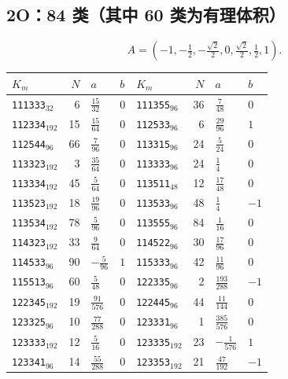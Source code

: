 \subsection{2O：84 类（其中 60 类为有理体积）}
\[ A=(-1,-\tfrac12,-\tfrac{\sqrt2}{2},0,\tfrac{\sqrt2}{2},\tfrac12,1).\]
{\footnotesize\begin{longtable}{@{}lrll@{\hspace{2em}}lrll@{}}
\toprule
$K_m$ & $N$ & $a$ & $b$ & $K_m$ & $N$ & $a$ & $b$\\\midrule\endhead
\texttt{111333}$_{32}$ & 6 & $\tfrac{15}{32}$ & 0 & \texttt{111355}$_{96}$ & 36 & $\tfrac{7}{48}$ & 0\\
\texttt{112334}$_{192}$ & 15 & $\tfrac{15}{64}$ & 0 & \texttt{112533}$_{96}$ & 6 & $\tfrac{29}{96}$ & $1$\\
\texttt{112544}$_{96}$ & 66 & $\tfrac{7}{96}$ & 0 & \texttt{113315}$_{96}$ & 24 & $\tfrac{5}{24}$ & 0\\
\texttt{113323}$_{192}$ & 3 & $\tfrac{35}{64}$ & 0 & \texttt{113333}$_{96}$ & 24 & $\tfrac{1}{4}$ & 0\\
\texttt{113334}$_{192}$ & 45 & $\tfrac{5}{64}$ & 0 & \texttt{113511}$_{48}$ & 12 & $\tfrac{17}{48}$ & 0\\
\texttt{113523}$_{192}$ & 18 & $\tfrac{19}{96}$ & 0 & \texttt{113533}$_{96}$ & 48 & $\tfrac{1}{4}$ & $-1$\\
\texttt{113534}$_{192}$ & 78 & $\tfrac{5}{96}$ & 0 & \texttt{113555}$_{96}$ & 84 & $\tfrac{1}{16}$ & 0\\
\texttt{114323}$_{192}$ & 33 & $\tfrac{9}{64}$ & 0 & \texttt{114522}$_{96}$ & 30 & $\tfrac{17}{96}$ & 0\\
\texttt{114533}$_{96}$ & 90 & $-\tfrac{5}{96}$ & $1$ & \texttt{115333}$_{96}$ & 42 & $\tfrac{11}{96}$ & 0\\
\texttt{115513}$_{96}$ & 60 & $\tfrac{5}{48}$ & 0 & \texttt{122335}$_{96}$ & 2 & $\tfrac{193}{288}$ & $-1$\\
\texttt{122345}$_{192}$ & 19 & $\tfrac{91}{576}$ & 0 & \texttt{122445}$_{96}$ & 44 & $\tfrac{11}{144}$ & 0\\
\texttt{123325}$_{96}$ & 10 & $\tfrac{77}{288}$ & 0 & \texttt{123331}$_{96}$ & 1 & $\tfrac{385}{576}$ & 0\\
\texttt{123333}$_{192}$ & 12 & $\tfrac{5}{16}$ & 0 & \texttt{123335}$_{192}$ & 23 & $-\tfrac{1}{576}$ & $1$\\
\texttt{123341}$_{96}$ & 14 & $\tfrac{55}{288}$ & 0 & \texttt{123353}$_{192}$ & 21 & $\tfrac{47}{192}$ & $-1$\\

\end{longtable}}
